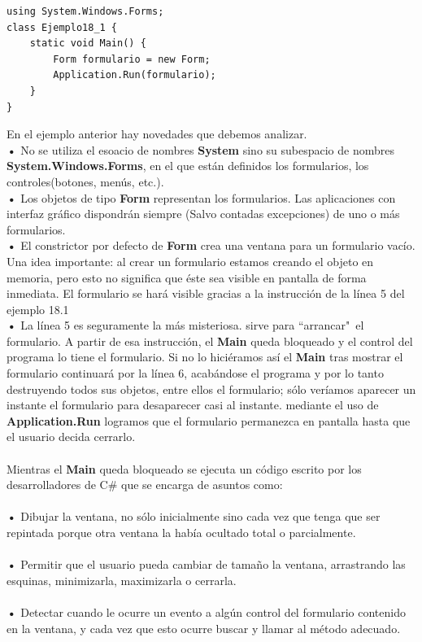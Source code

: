 \documentclass[12pt,a4paper]{report}
\begin{document}
\begin{lstlisting}
using System.Windows.Forms;
class Ejemplo18_1 {
	static void Main() {
		Form formulario = new Form;
		Application.Run(formulario);	
	}
}
\end{lstlisting} En el ejemplo anterior hay novedades que debemos analizar.\\\textbf{•} No se utiliza el esoacio de nombres \textbf{System} sino su subespacio de nombres \textbf{System.Windows.Forms}, en el que están definidos los formularios, los controles(botones, menús, etc.).\\\textbf{•} Los objetos de tipo \textbf{Form} representan los formularios. Las aplicaciones con interfaz gráfico dispondrán siempre (Salvo contadas excepciones) de uno o más formularios.\\\textbf{•} El constrictor por defecto de \textbf{Form} crea una ventana para un formulario vacío. Una idea importante: al crear un formulario estamos creando el objeto en memoria, pero esto no significa que éste sea visible en pantalla de forma inmediata. El formulario se hará visible gracias a la instrucción de la línea 5 del ejemplo 18.1\\\textbf{•} La línea 5 es seguramente la más misteriosa. sirve para ``arrancar"\ el formulario. A partir de esa instrucción, el \textbf{Main} queda bloqueado y el control del programa lo tiene el formulario. Si no lo hiciéramos así el \textbf{Main} tras mostrar el formulario continuará por la línea 6, acabándose el programa y por lo tanto destruyendo todos sus objetos, entre ellos el formulario; sólo veríamos aparecer un instante el formulario para desaparecer casi al instante. mediante el uso de \textbf{Application.Run} logramos que el formulario permanezca en pantalla hasta que el usuario decida cerrarlo.\\\\Mientras el \textbf{Main} queda  bloqueado se ejecuta un código escrito por los desarrolladores de C\# que se encarga de asuntos como:\\\\\textbf{•} Dibujar la ventana, no sólo inicialmente sino cada vez que tenga que ser repintada porque otra ventana la había ocultado total o parcialmente.\\\\\textbf{•} Permitir que el usuario pueda cambiar de tamaño la ventana, arrastrando las esquinas, minimizarla, maximizarla o cerrarla.\\\\\textbf{•} Detectar cuando le ocurre un evento a algún control del formulario contenido en la ventana, y cada vez que esto ocurre buscar y llamar al método adecuado.
\end{document}
